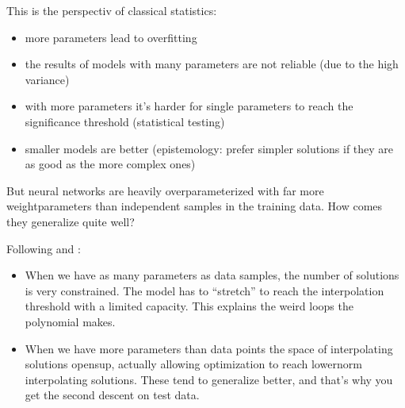 \documentclass[letterpaper,10pt,english]{jupyterBook}
\begin{document}
\noindent{}

\sphinxAtStartPar
This is the perspectiv of classical statistics:
\begin{itemize}
\item {} 
\sphinxAtStartPar
more parameters lead to overfitting

\item {} 
\sphinxAtStartPar
the results of models with many parameters are not reliable (due to the high variance)

\item {} 
\sphinxAtStartPar
with more parameters it’s harder for single parameters to reach the significance threshold (statistical testing)

\item {} 
\sphinxAtStartPar
smaller models are better (epistemology: prefer simpler solutions if they are as good as the more complex ones)

\end{itemize}

\sphinxAtStartPar
But neural networks are heavily over\sphinxhyphen{}parameterized with far more weight\sphinxhyphen{}parameters than independent samples in the training data. How comes they generalize quite well?

\sphinxAtStartPar
Following  and :
\begin{itemize}
\item {} 
\sphinxAtStartPar
When we have as many parameters as data samples, the number of solutions is very constrained. The model has to “stretch” to reach the interpolation threshold with a limited capacity. This explains the weird loops the polynomial makes.

\item {} 
\sphinxAtStartPar
When we have more parameters than data points the space of interpolating solutions opens\sphinxhyphen{}up, actually allowing optimization to reach lower\sphinxhyphen{}norm interpolating solutions. These tend to generalize better, and that’s why you get the second descent on test data.

\end{itemize}

\noindent{}
\end{document}
